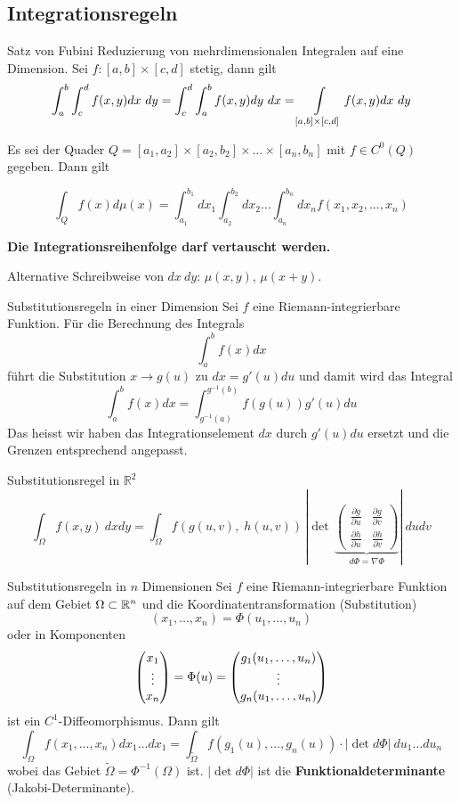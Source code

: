 \subsection{Integrationsregeln}

\begin{Satz}{Satz von Fubini}{}
    Reduzierung von mehrdimensionalen Integralen auf eine Dimension. Sei $f: [a,b] \times [c, d]$ stetig, dann gilt
    \[ \int_a^b \int_c^d f(x, y) dx ~ dy = \int_c^d \int_a^b f(x, y) dy ~ dx = \int\displaylimits_{[a,b] \times [c, d]} f(x, y) dx ~ dy   \]

    Es sei der Quader $Q = [a_1,a_2] \times [a_2, b_2] \times \dots \times [a_n, b_n]$ mit $f \in C^0(Q)$ gegeben. Dann gilt

    \[
        \int_Q f(x) d\mu(x) = \int_{a_1}^{b_1} dx_1 \int_{a_2}^{b_2} dx_2 \dots \int_{a_n}^{b_n} dx_n f(x_1, x_2,...,x_n)
    \]
    
    \textbf{Die Integrationsreihenfolge darf vertauscht werden.}
\end{Satz}

Alternative Schreibweise von $dx ~ dy$: $\mu(x, y)$, $\mu(x+y)$.

\begin{Satz}{Substitutionsregeln in einer Dimension}{}
    Sei $f$ eine Riemann-integrierbare Funktion. Für die Berechnung des Integrals
    \[
        \int_a^b f(x) dx
    \]
    führt die Substitution $x \to g(u)$ zu $dx = g'(u)du$ und damit wird das Integral
    \[
        \int_a^b f(x) dx = \int_{g^{-1}(a)}^{g^{-1}(b)} f(g(u)) g'(u) du
    \]
    Das heisst wir haben das Integrationselement $dx$ durch $g'(u)du$ ersetzt und die Grenzen entsprechend angepasst.
\end{Satz}


\begin{Satz}{Substitutionsregel in $\mathbb{R}^2$}{}
\[
\int_{\Omega} f(x,y) ~ dx dy = \int_{\widetilde{\Omega}} f(g(u, v), \; h(u, v)) \, 
		\left\lvert\det \, \underbrace{\begin{pmatrix}
			\frac{\partial g}{\partial u} & \frac{\partial g}{\partial v}\\
			\frac{\partial h}{\partial u} & \frac{\partial h}{\partial v}
		\end{pmatrix}}_{d\Phi = \nabla\Phi} \right\rvert
	~ du dv
\]
\end{Satz}



\begin{Satz}{Substitutionsregeln in $n$ Dimensionen}{}
    Sei $f$ eine Riemann-integrierbare Funktion auf dem Gebiet $\Omega \subset \mathbb{R}^n$ und die Koordinatentransformation (Substitution)
    \[
    (x_1,\hdots,x_n) = \Phi(u_1, \hdots,  u_n)
    \]
    oder in Komponenten
    \[
        \begin{pmatrix} x_1 \\ \vdots \\ x_n \end{pmatrix}
        = \Phi(u)
        = \begin{pmatrix} g_1(u_1,\hdots,u_n) \\ \vdots \\ g_n(u_1,\hdots,u_n) \end{pmatrix}
    \]
    ist ein $C^1$-Diffeomorphismus. Dann gilt
    \[
        \int_\Omega f(x_1, \hdots, x_n)dx_1\hdots dx_1 = \int_{\widetilde{\Omega}} f(g_1(u), \hdots, g_n(u)) \cdot |\det d \Phi|\ du_1\hdots du_n
    \]
    wobei das Gebiet $\widetilde{\Omega} = \Phi^{-1}(\Omega)$ ist. $|\det d\Phi|$ ist die \textbf{Funktionaldeterminante} (Jakobi-Determinante).
\end{Satz}


